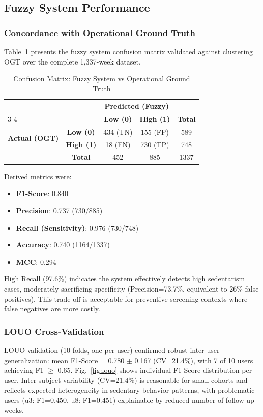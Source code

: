 \documentclass[journal,twoside,web]{ieeecolor}
\begin{document}
\subsection{Fuzzy System Performance}

\subsubsection{Concordance with Operational Ground Truth}
Table~\ref{tab:confusion} presents the fuzzy system confusion matrix validated against clustering OGT over the complete 1,337-week dataset.

\begin{table}[h]
\centering
\caption{Confusion Matrix: Fuzzy System vs Operational Ground Truth}
\label{tab:confusion}
\begin{tabular}{lcccc}
\hline
& & \multicolumn{2}{c}{\textbf{Predicted (Fuzzy)}} & \\
\cline{3-4}
& & \textbf{Low (0)} & \textbf{High (1)} & \textbf{Total} \\
\hline
\multirow{2}{*}{\textbf{Actual (OGT)}} & \textbf{Low (0)} & 434 (TN) & 155 (FP) & 589 \\
& \textbf{High (1)} & 18 (FN) & 730 (TP) & 748 \\
\hline
& \textbf{Total} & 452 & 885 & 1337 \\
\hline
\end{tabular}
\end{table}

Derived metrics were:
\begin{itemize}
\item \textbf{F1-Score}: 0.840
\item \textbf{Precision}: 0.737 (730/885)
\item \textbf{Recall (Sensitivity)}: 0.976 (730/748)
\item \textbf{Accuracy}: 0.740 (1164/1337)
\item \textbf{MCC}: 0.294
\end{itemize}

High Recall (97.6\%) indicates the system effectively detects high sedentarism cases, moderately sacrificing specificity (Precision=73.7\%, equivalent to 26\% false positives). This trade-off is acceptable for preventive screening contexts where false negatives are more costly.

\subsubsection{LOUO Cross-Validation}
LOUO validation (10 folds, one per user) confirmed robust inter-user generalization: mean F1-Score = 0.780 $\pm$ 0.167 (CV=21.4\%), with 7 of 10 users achieving F1 $\geq$ 0.65. Fig.~\ref{fig:louo} shows individual F1-Score distribution per user. Inter-subject variability (CV=21.4\%) is reasonable for small cohorts and reflects expected heterogeneity in sedentary behavior patterns, with problematic users (u3: F1=0.450, u8: F1=0.451) explainable by reduced number of follow-up weeks.
\end{document}

